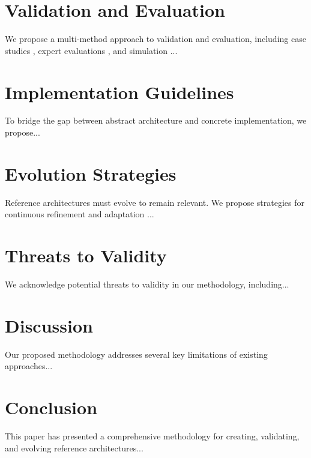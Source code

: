 \documentclass[12pt,a4paper]{article}
\begin{document}
\section{Validation and Evaluation}
\label{sec:validation}
We propose a multi-method approach to validation and evaluation, including case studies \citep{Runeson2009}, expert evaluations \citep{Beecham2005}, and simulation \citep{Martens2010}...

\section{Implementation Guidelines}
\label{sec:implementation}
To bridge the gap between abstract architecture and concrete implementation, we propose...

\section{Evolution Strategies}
\label{sec:evolution}
Reference architectures must evolve to remain relevant. We propose strategies for continuous refinement and adaptation \citep{Eixelsberger1998}...

\section{Threats to Validity}
\label{sec:threats}
We acknowledge potential threats to validity in our methodology, including...

\section{Discussion}
\label{sec:discussion}
Our proposed methodology addresses several key limitations of existing approaches...

\section{Conclusion}
\label{sec:conclusion}
This paper has presented a comprehensive methodology for creating, validating, and evolving reference architectures...



\end{document}
